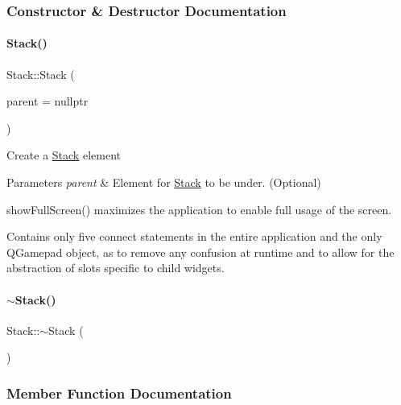 \subsubsection{Constructor \& Destructor Documentation}
\mbox{\label{classStack_aa9d4cb23f0d4ade8db1df8624629cc14}} 
\paragraph{\texorpdfstring{Stack()}{Stack()}}
{\footnotesize\ttfamily Stack\+::\+Stack (\begin{DoxyParamCaption}\item[{Q\+Widget $\ast$}]{parent = {\ttfamily nullptr} }\end{DoxyParamCaption})\hspace{0.3cm}{\ttfamily [explicit]}}

Create a \mbox{\hyperlink{classStack}{Stack}} element 
\begin{DoxyParams}{Parameters}
{\em parent} & Element for \mbox{\hyperlink{classStack}{Stack}} to be under. (Optional)\\
\hline
\end{DoxyParams}
show\+Full\+Screen() maximizes the application to enable full usage of the screen.

Contains only five connect statements in the entire application and the only Q\+Gamepad object, as to remove any confusion at runtime and to allow for the abstraction of slots specific to child widgets. \mbox{\label{classStack_a40bd5dff912f0e5290777c4b46d17809}} 
\paragraph{\texorpdfstring{$\sim$Stack()}{~Stack()}}
{\footnotesize\ttfamily Stack\+::$\sim$\+Stack (\begin{DoxyParamCaption}{ }\end{DoxyParamCaption})}



\subsubsection{Member Function Documentation}
\mbox{\label{classStack_a2f8a3dee32407abe994b7332282d03de}} 
